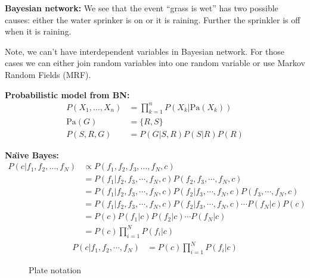 \documentclass{book}
\begin{document}
\noindent
\textbf{Bayesian network:} We see that the event ``grass is wet'' has two possible causes: either the water sprinker is on or it is raining. Further the sprinkler is off when it is raining. 
\begin{figure}[h]
\centering
{}
\end{figure}
Note, we can't have interdependent variables in Bayesian network. For those cases we can either join random variables into one random variable or use Markov Random Fields (MRF).

\noindent
\textbf{Probabilistic model from BN:}
\begin{align*}
P(X_1,\dots,X_n) &= \prod_{k=1}^{n} P(X_k \vert \text{Pa}(X_k)) \\
\text{Pa}(G) &= \{R, S\} \\
P(S, R, G) &= P(G \vert S, R) P(S \vert R) P(R)
\end{align*}

\noindent
\textbf{Na\"{\i}ve Bayes:}
\begin{align*} 
P(c|f_1,f_2,\dots,f_N) &\propto  P(f_1,f_2,f_3,\dots,f_N,c) \\ 
&=  P(f_1|f_2,f_3,\cdots,f_N,c)P(f_2,f_3,\cdots,f_N,c) \\ 
&= P(f_1|f_2,f_3,\cdots,f_N,c)P(f_2|f_3,\cdots,f_N,c)P(f_3,\cdots,f_N,c) \\
&=  P(f_1|f_2,f_3,\cdots,f_N,c)P(f_2|f_3,\cdots,f_N,c) \cdots P(f_N|c)P(c) \\ 
&=  P(c)P(f_1|c)P(f_2|c) \cdots P(f_N|c) \\
&=  P(c)\prod_{i=1}^{N} P(f_i|c)
\end{align*}
\begin{align*} 
P(c|f_1,f_2,\cdots,f_N) &= P(c)\prod_{i=1}^{N} P(f_i|c)
\end{align*}

\begin{figure}[h]
\centering
\caption{Plate notation}
\end{figure}
\end{document}
